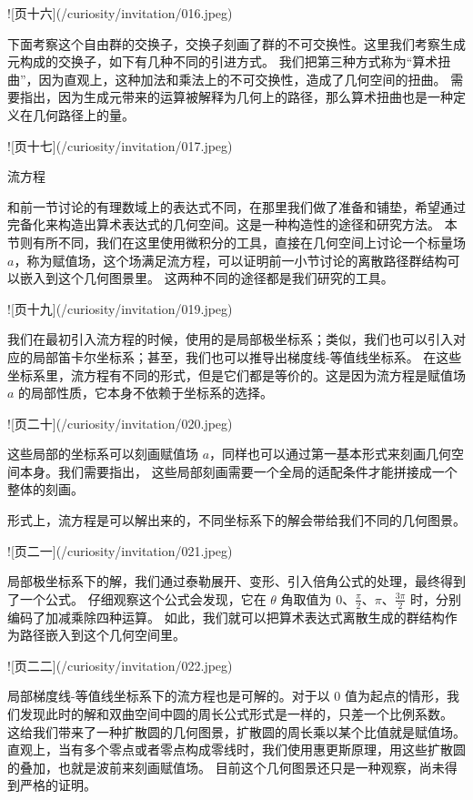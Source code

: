 \documentclass[a4paper,12pt]{book}
\numberwithin{problem}{section}
\numberwithin{definition}{section}
\numberwithin{lemma}{section}
\numberwithin{proposition}{section}
\numberwithin{theorem}{section}
\numberwithin{grammar}{section}
\numberwithin{program}{section}
\numberwithin{convention}{section}
\numberwithin{corollary}{section}
\begin{document}
![页十六](/curiosity/invitation/016.jpeg)

下面考察这个自由群的交换子，交换子刻画了群的不可交换性。这里我们考察生成元构成的交换子，如下有几种不同的引进方式。
我们把第三种方式称为“算术扭曲”，因为直观上，这种加法和乘法上的不可交换性，造成了几何空间的扭曲。
需要指出，因为生成元带来的运算被解释为几何上的路径，那么算术扭曲也是一种定义在几何路径上的量。

![页十七](/curiosity/invitation/017.jpeg)

流方程

和前一节讨论的有理数域上的表达式不同，在那里我们做了准备和铺垫，希望通过完备化来构造出算术表达式的几何空间。这是一种构造性的途径和研究方法。
本节则有所不同，我们在这里使用微积分的工具，直接在几何空间上讨论一个标量场$a$，称为赋值场，这个场满足流方程，可以证明前一小节讨论的离散路径群结构可以嵌入到这个几何图景里。
这两种不同的途径都是我们研究的工具。

![页十九](/curiosity/invitation/019.jpeg)

我们在最初引入流方程的时候，使用的是局部极坐标系；类似，我们也可以引入对应的局部笛卡尔坐标系；甚至，我们也可以推导出梯度线-等值线坐标系。
在这些坐标系里，流方程有不同的形式，但是它们都是等价的。这是因为流方程是赋值场 $a$ 的局部性质，它本身不依赖于坐标系的选择。

![页二十](/curiosity/invitation/020.jpeg)

这些局部的坐标系可以刻画赋值场 $a$，同样也可以通过第一基本形式来刻画几何空间本身。我们需要指出，
这些局部刻画需要一个全局的适配条件才能拼接成一个整体的刻画。

形式上，流方程是可以解出来的，不同坐标系下的解会带给我们不同的几何图景。

![页二一](/curiosity/invitation/021.jpeg)

局部极坐标系下的解，我们通过泰勒展开、变形、引入倍角公式的处理，最终得到了一个公式。
仔细观察这个公式会发现，它在 $\theta$ 角取值为 $0$、$\frac{\pi}{2}$、$\pi$、$\frac{3\pi}{2}$ 时，分别编码了加减乘除四种运算。
如此，我们就可以把算术表达式离散生成的群结构作为路径嵌入到这个几何空间里。

![页二二](/curiosity/invitation/022.jpeg)

局部梯度线-等值线坐标系下的流方程也是可解的。对于以 $0$ 值为起点的情形，我们发现此时的解和双曲空间中圆的周长公式形式是一样的，只差一个比例系数。
这给我们带来了一种扩散圆的几何图景，扩散圆的周长乘以某个比值就是赋值场。
直观上，当有多个零点或者零点构成零线时，我们使用惠更斯原理，用这些扩散圆的叠加，也就是波前来刻画赋值场。
目前这个几何图景还只是一种观察，尚未得到严格的证明。
\end{document}

